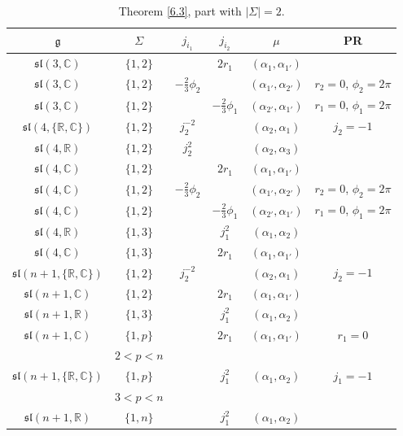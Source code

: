 \documentclass[10pt,a4paper]{amsart}
\newcommand{\Si}{\Sigma}
\newcommand{\fg}{\mathfrak g}
\newcommand{\R}{\mathbb{R}}
\newcommand{\C}{\mathbb{C}}
\numberwithin{equation}{section}
\begin{document}
\begin{table}[th!]\centering \caption{Theorem \ref{6.3}, part with $|\Si|=2$.}\label{ahs2} \vspace{1mm}
\begin{tabular}{|c|c|c|c|c|c|}
\hline
$\fg$ & $\Sigma$ & $j_{i_1}$& $j_{i_2}$& $\mu$&PR \\
\hline
\hline
$\mathfrak{sl}(3,\mathbb{C})$ &$\{1,2\}$&& $2r_1$& $(\alpha_{1},\alpha_{1'})$& \\
\hline
$\mathfrak{sl}(3,\mathbb{C})$& $\{1,2\}$ &$-\frac{2}3\phi_2$& & $ (\alpha_{1'},\alpha_{2'})$& $r_2=0$, $\phi_2=2\pi$ \\
\hline
$\mathfrak{sl}(3,\mathbb{C})$& $\{1,2\}$ && $-\frac23\phi_1$& $ (\alpha_{2'},\alpha_{1'})$& $r_1=0$, $\phi_1=2\pi$ \\
\hline
$\mathfrak{sl}(4,\{\R,\C\})$ & $\{1,2\}$ & $j_2^{-2}$ & & $(\alpha_2,\alpha_1)$& $j_2=-1$ \\
\hline
$\mathfrak{sl}(4,\R)$ & $\{1,2\}$ &$j_2^2$ && $(\alpha_2,\alpha_3)$ & \\
\hline
$\mathfrak{sl}(4,\mathbb{C})$ &$\{1,2\}$&& $2r_1$& $(\alpha_{1},\alpha_{1'})$& \\
\hline
$\mathfrak{sl}(4,\mathbb{C})$& $\{1,2\}$ &$-\frac23\phi_2$& & $ (\alpha_{1'},\alpha_{2'})$& $r_2=0$, $\phi_2=2\pi$ \\
\hline
$\mathfrak{sl}(4,\mathbb{C})$& $\{1,2\}$ && $-\frac23\phi_1$& $ (\alpha_{2'},\alpha_{1'})$& $r_1=0$, $\phi_1=2\pi$ \\
\hline
$\mathfrak{sl}(4,\R)$ & $\{1,3\}$ &&$j_1^2$ &$(\alpha_1,\alpha_2)$& \\
\hline
$\mathfrak{sl}(4,\mathbb{C})$ &$\{1,3\}$&& $2r_1$& $(\alpha_{1},\alpha_{1'})$& \\
\hline
$\mathfrak{sl}(n+1,\{\R,\C\})$ & $\{1,2\}$ & $j_2^{-2}$ & & $(\alpha_2,\alpha_1)$& $j_2=-1$ \\
\hline
$\mathfrak{sl}(n+1,\mathbb{C})$ &$\{1,2\}$&& $2r_1$& $(\alpha_{1},\alpha_{1'})$& \\
\hline
$\mathfrak{sl}(n+1,\R)$ & $\{1,3\}$ &&$j_1^2$ &$(\alpha_1,\alpha_2)$& \\
\hline
$\mathfrak{sl}(n+1,\mathbb{C})$ &$\{1,p\}$&& $2r_1$& $(\alpha_{1},\alpha_{1'})$&$r_1=0$\\
& $2<p<n$& & &&\\
\hline
$\mathfrak{sl}(n+1,\{\R,\C\})$ & $\{1,p\}$ &&$j_1^2$ &$(\alpha_1,\alpha_2)$& $j_1=-1$ \\
& $3<p<n$& & &&\\
\hline
$\mathfrak{sl}(n+1,\R)$ & $\{1,n\}$ &&$j_1^2$ &$(\alpha_1,\alpha_2)$& \\

\end{tabular}
\end{table}
\end{document}
